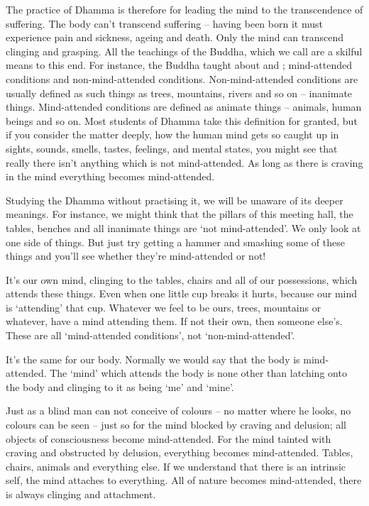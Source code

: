 The practice of Dhamma is therefore for leading the mind to the transcendence of suffering. The body can't transcend suffering -- having been born it must experience pain and sickness, ageing and death. Only the mind can transcend clinging and grasping. All the teachings of the Buddha, which we call  are a skilful means to this end. For instance, the Buddha taught about  and ; mind-attended conditions and non-mind-attended conditions. Non-mind-attended conditions are usually defined as such things as trees, mountains, rivers and so on -- inanimate things. Mind-attended conditions are defined as animate things -- animals, human beings and so on. Most students of Dhamma take this definition for granted, but if you consider the matter deeply, how the human mind gets so caught up in sights, sounds, smells, tastes, feelings, and mental states, you might see that really there isn't anything which is not mind-attended. As long as there is craving in the mind everything becomes mind-attended. 

Studying the Dhamma without practising it, we will be unaware of its deeper meanings. For instance, we might think that the pillars of this meeting hall, the tables, benches and all inanimate things are `not mind-attended'. We only look at one side of things. But just try getting a hammer and smashing some of these things and you'll see whether they're mind-attended or not! 

It's our own mind, clinging to the tables, chairs and all of our possessions, which attends these things. Even when one little cup breaks it hurts, because our mind is `attending' that cup. Whatever we feel to be ours, trees, mountains or whatever, have a mind attending them. If not their own, then someone else's. These are all `mind-attended conditions', not `non-mind-attended'. 

It's the same for our body. Normally we would say that the body is mind-attended. The `mind' which attends the body is none other than  latching onto the body and clinging to it as being `me' and `mine'. 

Just as a blind man can not conceive of colours -- no matter where he looks, no colours can be seen -- just so for the mind blocked by craving and delusion; all objects of consciousness become mind-attended. For the mind tainted with craving and obstructed by delusion, everything becomes mind-attended. Tables, chairs, animals and everything else. If we understand that there is an intrinsic self, the mind attaches to everything. All of nature becomes mind-attended, there is always clinging and attachment. 

